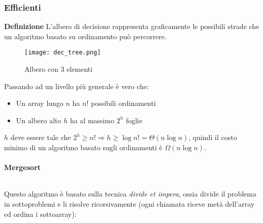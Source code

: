 \documentclass{article}
\begin{document}
\newpage

\subsubsection{Efficienti}

\textbf{Definizione} L'albero di decisione rappresenta graficamente le possibili strade che un algoritmo basato su ordinamento può percorrere.

\begin{figure}[ht]
    \centering
    \texttt{[image: dec\_tree.png]}
    \caption{Albero con 3 elementi}
    \label{fig:dec_tree}
\end{figure}

\noindent Passando ad un livello più generale è vero che:
\begin{itemize}
    \item Un array lungo $n$ ha $n!$ possibili ordinamenti
    \item Un albero alto $h$ ha al massimo $2^h$ foglie
\end{itemize}

\noindent $h$ deve essere tale che $2^h\geq n!\Rightarrow h\geq \log n!=\Theta(n\log n)$, quindi il costo minimo di un algoritmo basato sugli ordinamenti è $\Omega(n\log n)$.

\newpage

\paragraph{Mergesort} $\ $\newline

\noindent Questo algoritmo è basato sulla tecnica \textit{divide et impera}, ossia divide il problema in sottoproblemi e li risolve ricorsivamente (ogni chiamata riceve metà dell'array ed ordina i sottoarray):
\end{document}
